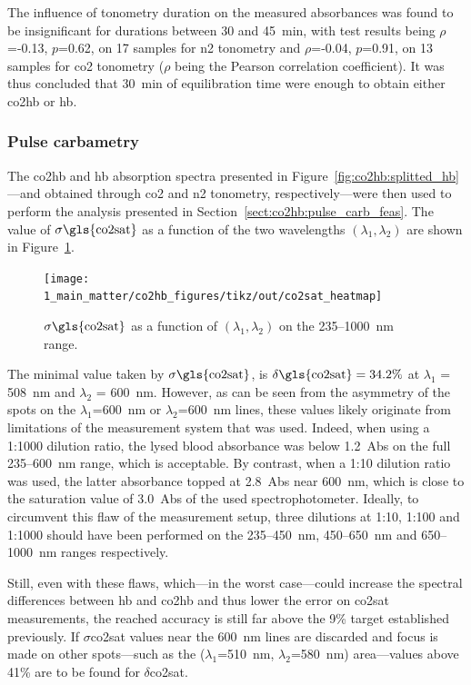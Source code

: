 The influence of tonometry duration on the measured absorbances was found to be insignificant for durations between 30 and 45~min, with test results being {$\rho$}=-0.13, {$p$}=0.62, on 17 samples for {\gls{n2}} tonometry and {$\rho$}=-0.04, {$p$}=0.91, on 13 samples for {\gls{co2}} tonometry ($\rho$ being the Pearson correlation coefficient). It was thus concluded that 30~min of equilibration time were enough to obtain either {\gls{co2hb}} or {\gls{hb}}.

\subsubsection{Pulse carbametry}

The \gls{co2hb} and \gls{hb} absorption spectra presented in Figure~\ref{fig:co2hb:splitted_hb}---and obtained through \gls{co2} and \gls{n2} tonometry, respectively---were then used to perform the analysis presented in Section~\ref{sect:co2hb:pulse_carb_feas}. The value of $\sigma\text{\gls{co2sat}}$ as a function of the two wavelengths $(\lambda_1, \lambda_2)$ are shown in Figure~\ref{fig:co2hb:satco2_err}.

\begin{figure}
	\centering
	\texttt{[image: 1\_main\_matter/co2hb\_figures/tikz/out/co2sat\_heatmap]}
	\caption{$\sigma\text{\gls{co2sat}}$ as a function of $(\lambda_1, \lambda_2)$ on the 235--1000~nm range.}
	\label{fig:co2hb:satco2_err}
\end{figure}

The minimal value taken by $\sigma\text{\gls{co2sat}}$, is $\delta\text{\gls{co2sat}} = 34.2\%$ at $\lambda_1$ = 508~nm and $\lambda_2$ = 600~nm. However, as can be seen from the asymmetry of the spots on the $\lambda_1$=600~nm or $\lambda_2$=600~nm lines, these values likely originate from limitations of the measurement system that was used. Indeed, when using a 1:1000 dilution ratio, the lysed blood absorbance was below 1.2~Abs on the full 235--600~nm range, which is acceptable. By contrast, when a 1:10 dilution ratio was used, the latter absorbance topped at 2.8~Abs near 600~nm, which is close to the saturation value of 3.0~Abs of the used spectrophotometer. Ideally, to circumvent this flaw of the measurement setup, three dilutions at 1:10, 1:100 and 1:1000 should have been performed on the 235--450~nm, 450--650~nm and 650--1000~nm ranges respectively.

Still, even with these flaws, which---in the worst case---could increase the spectral differences between \gls{hb} and \gls{co2hb} and thus lower the error on \gls{co2sat} measurements, the reached accuracy is still far above the 9\% target established previously. If $\sigma$\gls{co2sat} values near the 600~nm lines are discarded and focus is made on other spots---such as the ($\lambda_1$=510~nm, $\lambda_2$=580~nm) area---values above 41\% are to be found for $\delta$\gls{co2sat}.

